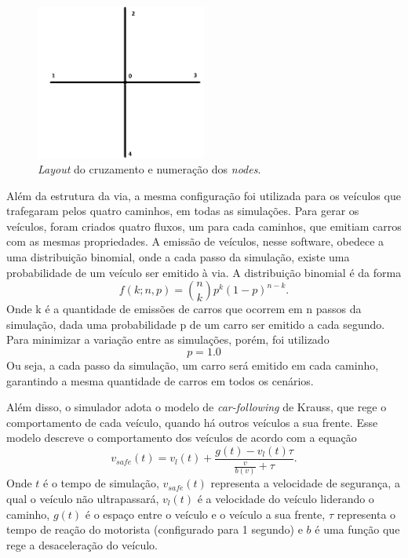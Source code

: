 \begin{figure}[ht]
    \begin{center}
    \includegraphics[width=0.5\textwidth]{figuras/Simulation_Scenario.png}
    \end{center}
    \caption[Estrutura da simulação]{\textit{Layout} do cruzamento e numeração dos \textit{nodes}.}
    \label{simulationLayout}
\end{figure}

Além da estrutura da via, a mesma configuração foi utilizada para os veículos que trafegaram pelos quatro caminhos, em todas as simulações. Para gerar os veículos, foram criados quatro fluxos, um para cada caminhos, que emitiam carros com as mesmas propriedades. A emissão de veículos, nesse software, obedece a uma distribuição binomial, onde a cada passo da simulação, existe uma probabilidade de um veículo ser emitido à via. A distribuição binomial é da forma 
\begin{equation}
    \label{eq:prj1}
    f(k;n,p) = {n\choose k}p^k(1-p)^{n-k}.
\end{equation}
Onde k é a quantidade de emissões de carros que ocorrem em n passos da simulação, dada uma probabilidade p de um carro ser emitido a cada segundo. Para minimizar a variação entre as simulações, porém, foi utilizado
\begin{equation}
    \label{eq:prj2}
    p = 1.0
\end{equation}
 Ou seja, a cada passo da simulação, um carro será emitido em cada caminho, garantindo a mesma quantidade de carros em todos os cenários.
 
Além disso, o simulador adota o modelo de \textit{car-following} de Krauss, que rege o comportamento de cada veículo, quando há outros veículos a sua frente\cite{krauss}. Esse modelo descreve o comportamento dos veículos de acordo com a equação
\begin{equation}
    \label{eq:prj3}
    v_{safe}(t) = v_l(t) + \frac{g(t) - v_l(t)\tau}{\frac{v}{b(v)} + \tau}.
\end{equation}
Onde $t$ é o tempo de simulação, $v_{safe}(t)$ representa a velocidade de segurança, a qual o veículo não ultrapassará, $v_l(t)$ é a velocidade do veículo liderando o caminho, $g(t)$ é o espaço entre o veículo e o veículo a sua frente, $\tau$ representa o tempo de reação do motorista (configurado para 1 segundo) e $b$ é uma função que rege a desaceleração do veículo. 

